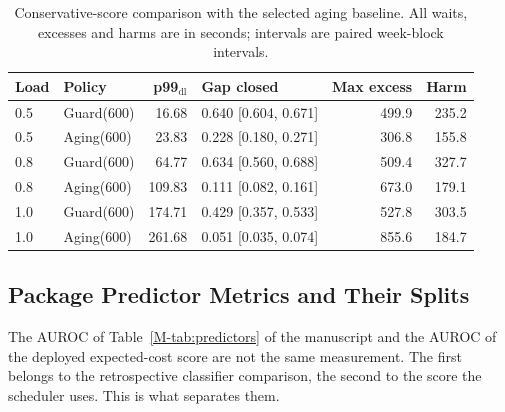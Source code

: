 \documentclass[mathematics,supfile,submit,moreauthors]{Definitions/mdpi}
\newcommand{\devnum}[1]{#1}
\begin{document}
\begin{table}[htbp]
\centering\small
\caption{Conservative-score comparison with the selected aging baseline. All waits,
excesses and harms are in seconds; intervals are paired week-block intervals.}
\label{tab:s_aging_results}
\begin{tabular}{llrlrr}
\toprule
Load & Policy & p99$_{\mathrm{dl}}$ & Gap closed & Max excess & Harm \\
\midrule
\devnum{0.5} & Guard(600) & \devnum{16.68} & \devnum{0.640 [0.604, 0.671]} & \devnum{499.9} & \devnum{235.2} \\
\devnum{0.5} & Aging(600) & \devnum{23.83} & \devnum{0.228 [0.180, 0.271]} & \devnum{306.8} & \devnum{155.8} \\
\devnum{0.8} & Guard(600) & \devnum{64.77} & \devnum{0.634 [0.560, 0.688]} & \devnum{509.4} & \devnum{327.7} \\
\devnum{0.8} & Aging(600) & \devnum{109.83} & \devnum{0.111 [0.082, 0.161]} & \devnum{673.0} & \devnum{179.1} \\
\devnum{1.0} & Guard(600) & \devnum{174.71} & \devnum{0.429 [0.357, 0.533]} & \devnum{527.8} & \devnum{303.5} \\
\devnum{1.0} & Aging(600) & \devnum{261.68} & \devnum{0.051 [0.035, 0.074]} & \devnum{855.6} & \devnum{184.7} \\
\bottomrule
\end{tabular}
\end{table}


\subsection{Package Predictor Metrics and Their Splits}
\label{sec:supp_devpred}

The AUROC of Table~\ref*{M-tab:predictors} of the manuscript and the AUROC of the deployed
expected-cost score are not the same measurement. The first belongs to the retrospective
classifier comparison, the second to the score the scheduler uses. This is what separates
them.
\end{document}
